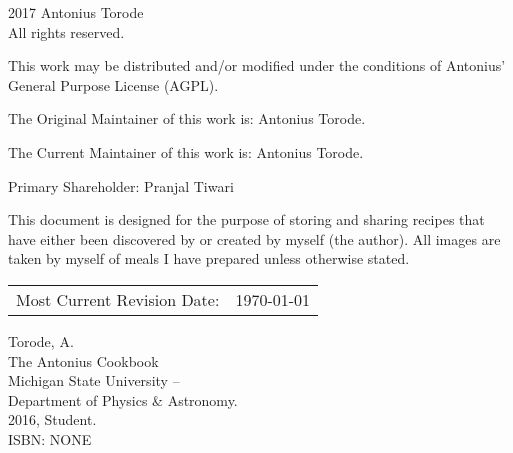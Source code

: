 \pagestyle{empty}
\AddToShipoutPicture*{\TowerGarden}
\begingroup
\footnotesize
\parindent 0pt
\parskip \baselineskip
\textcopyright{} 2017 Antonius Torode \\
All rights reserved.

This work may be distributed and/or modified under the conditions of Antonius’ General Purpose License (AGPL).

The Original Maintainer of this work is: Antonius Torode.

The Current Maintainer of this work is: Antonius Torode.

Primary Shareholder: Pranjal Tiwari

This document is designed for the purpose of storing and sharing recipes that have either been discovered by or created by myself (the author). All images are taken by myself of meals I have prepared unless otherwise stated.

\begin{center}
\begin{tabular}{ll}
Most Current Revision Date: &  \today 
\end{tabular}
\end{center}

\vfill


Torode, A.\\
\hspace*{2em} The Antonius Cookbook \\
\hspace*{2em} Michigan State University -- \\
\hspace*{2em} Department of Physics \& Astronomy. \\
\hspace*{2em} 2016, Student. \\
\hspace*{2em} ISBN: NONE \\



\endgroup
\clearpage